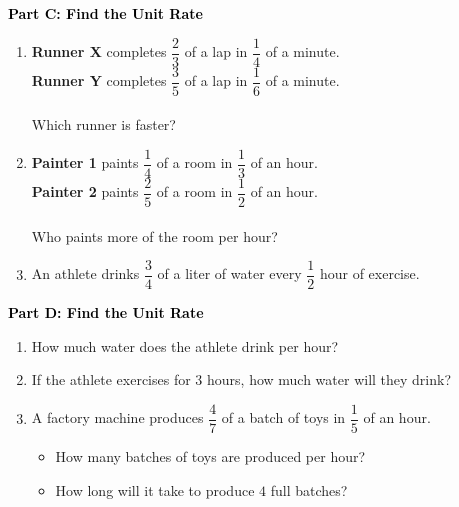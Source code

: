 \documentclass[12pt, letterpaper, fleqn]{article}
\begin{document}
\newpage

\begin{tcolorbox}[colback=customteal!20]
\large\textcolor{black}{\textbf{Part C: Find the Unit Rate}}
\end{tcolorbox}

\vspace{3mm}

\begin{enumerate}[itemsep=4.2cm, leftmargin=0.6cm, resume]
\item \textbf{Runner X} completes $\dfrac{2}{3}$ of a lap in $\dfrac{1}{4}$ of a minute. \\
\textbf{Runner Y} completes $\dfrac{3}{5}$ of a lap in $\dfrac{1}{6}$ of a minute. \\ \\
Which runner is faster?
\item \textbf{Painter 1} paints $\dfrac{1}{4}$ of a room in $\dfrac{1}{3}$ of an hour. \\
\textbf{Painter 2} paints $\dfrac{2}{5}$ of a room in $\dfrac{1}{2}$ of an hour. \\ \\
Who paints more of the room per hour?
\item An athlete drinks $\dfrac{3}{4}$ of a liter of water every $\dfrac{1}{2}$ hour of exercise.
\end{enumerate}

\newpage

\begin{tcolorbox}[colback=customteal!20]
\large\textcolor{black}{\textbf{Part D: Find the Unit Rate}}
\end{tcolorbox}

\vspace{3mm}

\begin{enumerate}[itemsep=4.2cm, leftmargin=0.6cm, resume]
\item How much water does the athlete drink per hour?
\item If the athlete exercises for $3$ hours, how much water will they drink?
\item A factory machine produces $\dfrac{4}{7}$ of a batch of toys in $\dfrac{1}{5}$ of an hour.
\begin{itemize}
\item How many batches of toys are produced per hour?
\item How long will it take to produce $4$ full batches?
\end{itemize}
\end{enumerate}
\end{document}
